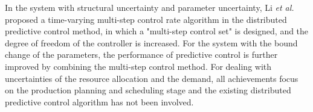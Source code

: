 \documentclass[runningheads]{llncs}
\begin{document}
In the system with structural uncertainty and parameter uncertainty, Li \emph{et al.} \cite{lidewei} proposed a time-varying multi-step control rate algorithm in the distributed predictive control method, in which a "multi-step control set" is designed, and the degree of freedom of the controller is increased. For the system with the bound change of the parameters, the performance of predictive control is further improved by combining the multi-step control method. For dealing with uncertainties of the resource allocation and the demand, all achievements focus on the production planning and scheduling stage and the existing distributed predictive control algorithm has not been involved.


\end{document}
